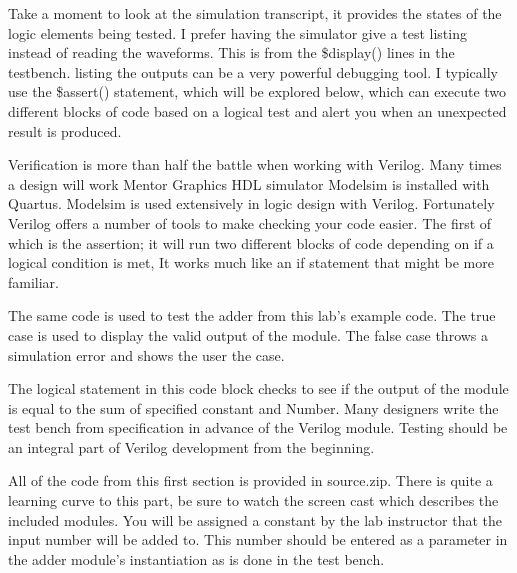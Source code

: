       Take a moment to look at the simulation transcript, it provides the states of the logic elements being tested.
      I prefer having the simulator give a test listing instead of reading the waveforms. This is from the \$display()
      lines in the testbench. listing the outputs can be a very powerful debugging tool. I typically use the \$assert()
      statement, which will be explored below, which can execute two different blocks of code based on a logical test and alert you when an unexpected result is produced.
      

      Verification is more than half the battle when working with Verilog. Many times a design will work Mentor Graphics HDL simulator Modelsim is installed with Quartus. Modelsim is used extensively in logic design with Verilog. Fortunately Verilog offers a number of tools to make checking your code easier. The first of which is the assertion; it will run two different blocks of code depending on if a logical condition is met, It works much like an if statement that might be more familiar.
      

      The same code is used to test the adder from this lab's example code. The true case is used to display the valid output of the module. The false case throws a simulation error and shows the user the case. 
      

      The logical statement in this code block checks to see if the output of the module is equal to the sum of specified constant and Number. Many designers write the test bench from specification in advance of the Verilog module. Testing should be an integral part of Verilog development from the beginning.

      All of the code from this first section is provided in source.zip. There is quite a learning curve to this part, be sure to watch the screen cast which describes the included modules. You will be assigned a constant by the lab instructor that the input number will be added to. This number should be entered as a parameter in the adder module's instantiation as is done in the test bench.

